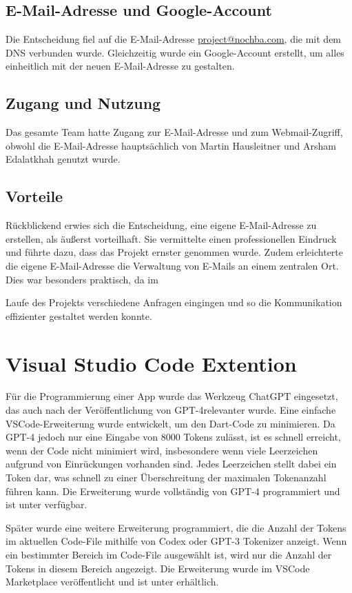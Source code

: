 \subsection{E-Mail-Adresse und Google-Account}
Die Entscheidung fiel auf die E-Mail-Adresse
\href{mailto:project@nochba.com}{project@nochba.com}, die mit dem DNS verbunden wurde.
Gleichzeitig wurde ein Google-Account erstellt, um alles
einheitlich mit der neuen E-Mail-Adresse zu gestalten.

\subsection{Zugang und Nutzung}
Das gesamte Team hatte Zugang zur E-Mail-Adresse und zum Webmail-Zugriff, obwohl die E-Mail-Adresse hauptsächlich von Martin Hausleitner und Arsham Edalatkhah genutzt wurde.

\subsection{Vorteile}
Rückblickend erwies sich die Entscheidung, eine eigene
E-Mail-Adresse zu erstellen, als äußerst vorteilhaft. Sie
vermittelte einen professionellen Eindruck und führte dazu,
dass das Projekt ernster genommen wurde. Zudem erleichterte
die eigene E-Mail-Adresse die Verwaltung von E-Mails an
einem zentralen Ort. Dies war besonders praktisch, da im


Laufe des Projekts verschiedene Anfragen eingingen und so
die Kommunikation effizienter gestaltet werden konnte.


\section{Visual Studio Code Extention}

Für die Programmierung einer App wurde das Werkzeug ChatGPT
eingesetzt, das auch nach der Veröffentlichung von
GPT-4relevanter wurde.  Eine einfache VSCode-Erweiterung
wurde entwickelt, um den Dart-Code zu minimieren. Da GPT-4
jedoch nur eine Eingabe von 8000 Tokens zulässt, ist es
schnell erreicht, wenn der Code nicht minimiert wird,
insbesondere wenn viele Leerzeichen aufgrund von
Einrückungen vorhanden sind. Jedes Leerzeichen stellt dabei
ein Token dar, was schnell zu einer Überschreitung der
maximalen Tokenanzahl führen kann. Die Erweiterung wurde
vollständig von GPT-4 programmiert und ist unter
\cite{copyminify} verfügbar.

Später wurde eine weitere Erweiterung programmiert, die die Anzahl der Tokens im aktuellen Code-File mithilfe von Codex oder GPT-3 Tokenizer anzeigt. Wenn ein bestimmter Bereich im Code-File ausgewählt ist, wird nur die Anzahl der Tokens in diesem Bereich angezeigt. Die Erweiterung wurde im VSCode Marketplace veröffentlicht und ist unter \cite{tokenizer} erhältlich.


